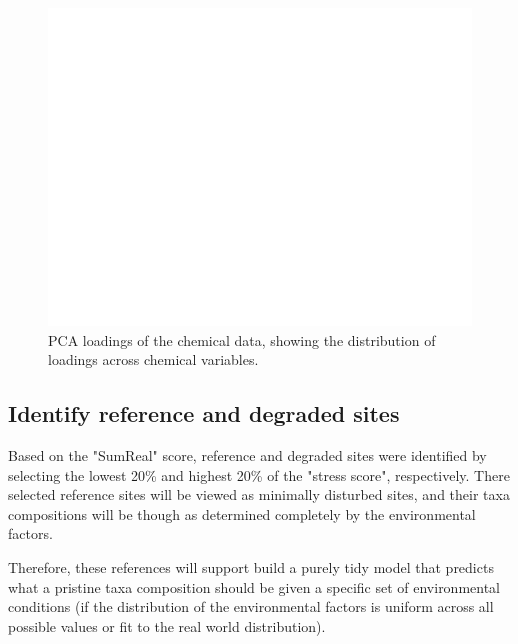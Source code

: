 \begin{figure}[!h]
    \centering
    \includegraphics[width=\textwidth]{../results/preliminary_results/pca_loadings_chemical.png}
    \caption{PCA loadings of the chemical data, showing the distribution of loadings across chemical variables.}
    \label{fig:chemical_pca_loadings}
\end{figure}


\subsection{Identify reference and degraded sites}

Based on the "SumReal" score, reference and degraded sites were identified by selecting
the lowest 20\% and highest 20\% of the "stress score", respectively.
There selected reference sites will be viewed as minimally disturbed sites, and 
their taxa compositions will be though as determined completely by the environmental factors.


Therefore, these references will support build a purely tidy model that predicts what
a pristine taxa composition should be given a specific set of environmental conditions
(if the distribution of the
environmental factors is uniform across all possible values or fit to the real world distribution).


